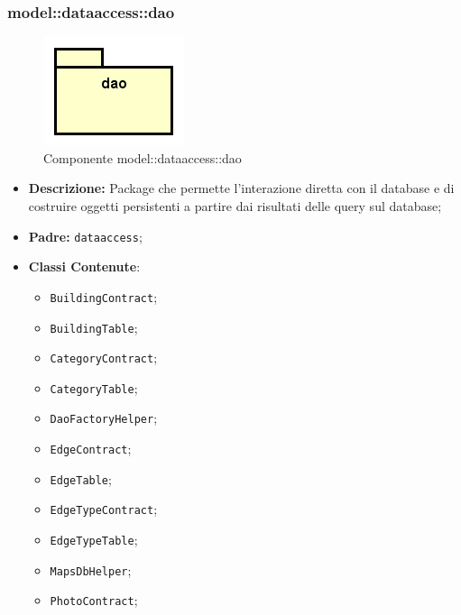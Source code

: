 \documentclass[../DefinizioneDiProdotto.tex]{subfiles}
\begin{document}
\subsubsection{model::\-dataaccess::\-dao}

\begin{figure}[H]
	\centering
	\includegraphics[width=\maxwidth]{img/package/dao.png}
	\caption{Componente model::\-dataaccess::\-dao}\label{fig:model::dataaccess::dao} 
\end{figure}
\begin{itemize}
	\item \textbf{Descrizione:} Package che permette l'interazione diretta con il database e di costruire oggetti persistenti a partire dai risultati delle query sul database;
	\item \textbf{Padre:} \texttt{dataaccess};
	\item \textbf{Classi Contenute}:
	\begin{itemize}
		\item \texttt{BuildingContract};
		
		\item \texttt{BuildingTable};
		
		\item \texttt{CategoryContract};
		
		\item \texttt{CategoryTable};
		
		\item \texttt{DaoFactoryHelper};
		
		\item \texttt{EdgeContract};
		
		\item \texttt{EdgeTable};
		
		\item \texttt{EdgeTypeContract};
		
		\item \texttt{EdgeTypeTable};
		
		\item \texttt{MapsDbHelper};
		
		\item \texttt{PhotoContract};
		

\end{itemize}
\end{itemize}
\end{document}
